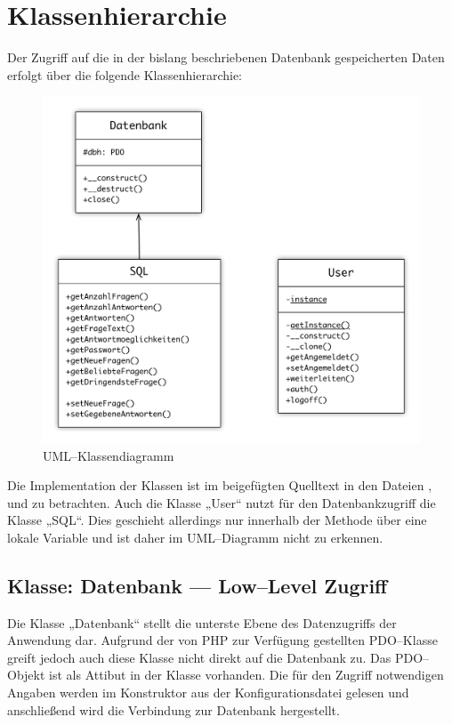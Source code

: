 \section{Klassenhierarchie}
\label{sec:klassen}
Der Zugriff auf die in der bislang beschriebenen Datenbank gespeicherten Daten erfolgt über die folgende  Klassenhierarchie:

\begin{figure}[H]
\begin{center}
\includegraphics[width=\textwidth]{UML.jpg}
\caption{UML--Klassendiagramm}
\label{fig:uml}
\end{center}
\end{figure}

Die Implementation der Klassen ist im beigefügten Quelltext in den Dateien ,  und  zu betrachten. Auch die Klasse „User“ nutzt für den Datenbankzugriff die Klasse „SQL“. Dies geschieht allerdings nur innerhalb der Methode  über eine lokale Variable und ist daher im UML--Diagramm nicht zu erkennen.

\subsection{Klasse: Datenbank --- Low--Level Zugriff}

Die Klasse „Datenbank“ stellt die unterste Ebene des Datenzugriffs der Anwendung dar. Aufgrund der von PHP zur Verfügung gestellten PDO--Klasse greift jedoch auch diese Klasse nicht direkt auf die Datenbank  zu. Das PDO--Objekt ist als Attibut in der Klasse vorhanden. Die für den Zugriff notwendigen Angaben werden im Konstruktor aus der Konfigurationsdatei  gelesen und anschließend wird die Verbindung zur Datenbank hergestellt. 


